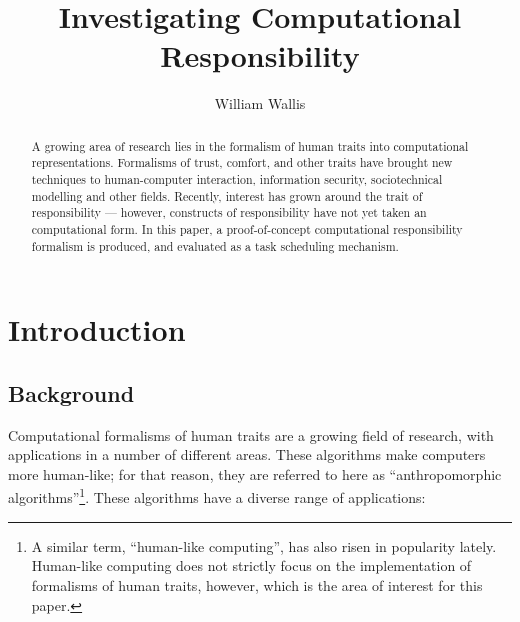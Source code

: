 



\title{Investigating Computational Responsibility}
\author{William Wallis}

\maketitle

\begin{abstract}

A growing area of research lies in the formalism of human traits into computational representations. Formalisms of trust, comfort, and other traits have brought new techniques to human-computer interaction, information security, sociotechnical modelling and other fields. Recently, interest has grown around the trait of responsibility --- however, constructs of responsibility have not yet taken an computational form. In this paper, a proof-of-concept computational responsibility formalism is produced, and evaluated as a task scheduling mechanism.
\end{abstract}

\section{Introduction}


\subsection{Background}

Computational formalisms of human traits are a growing field of research, with applications in a number of different areas. These algorithms make computers more human-like; for that reason, they are referred to here as ``anthropomorphic algorithms''\footnote{A similar term, ``human-like computing'', has also risen in popularity lately. Human-like computing does not strictly focus on the implementation of formalisms of human traits, however, which is the area of interest for this paper.}. These algorithms have a diverse range of applications:

